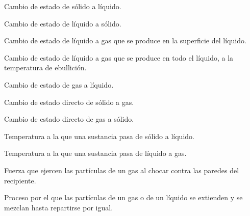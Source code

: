 \begin{vocabulary}
    Cambio de estado de sólido a líquido.
\end{vocabulary}

\begin{vocabulary}
    Cambio de estado de líquido a sólido.
\end{vocabulary}

\begin{vocabulary}
    Cambio de estado de líquido a gas que se produce en la superficie del líquido.
\end{vocabulary}

\begin{vocabulary}
    Cambio de estado de líquido a gas que se produce en todo el líquido, a la temperatura de ebullición.
\end{vocabulary}

\begin{vocabulary}
    Cambio de estado de gas a líquido.
\end{vocabulary}

\begin{vocabulary}
    Cambio de estado directo de sólido a gas.
\end{vocabulary}

\begin{vocabulary}
    Cambio de estado directo de gas a sólido.
\end{vocabulary}

\begin{vocabulary}
    Temperatura a la que una sustancia pasa de sólido a líquido.
\end{vocabulary}

\begin{vocabulary}
    Temperatura a la que una sustancia pasa de líquido a gas.
\end{vocabulary}

\begin{vocabulary}
    Fuerza que ejercen las partículas de un gas al chocar contra las paredes del recipiente.
\end{vocabulary}

\begin{vocabulary}
    Proceso por el que las partículas de un gas o de un líquido se extienden y se mezclan hasta repartirse por igual.
\end{vocabulary}

